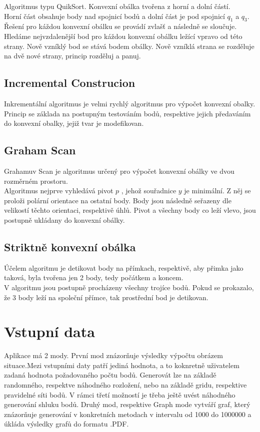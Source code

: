 \documentclass{article}
\begin{document}
Algoritmus typu QuikSort. Konvexní obálka tvořena z horní a dolní částí.\\
Horní část obsahuje body nad spojnicí bodů a dolní část je pod spojnicí $q_1$ a $q_3$.\\
Řešení pro káždou konvexní obálku se provádí zvlašť a následně se sloučuje. Hledáme nejvzdalenější bod pro káždou konvexní obálku ležící vpravo od této strany. Nově vzníklý bod se stává bodem obálky. Nově vzníklá strana se rozděluje na dvě nové strany, princip rozděluj a panuj.\\
\bigskip
\subsection{Incremental Construcion}

Inkrementální algoritmus je velmi rychlý algoritmus pro výpočet konvexní obalky. Princip se základa na postupným testováním bodů, respektive jejich předaváním do konvexní obalky, jejiž tvar je modefikovan.\\
\bigskip

\subsection{Graham Scan} 
Grahamuv Scan je algoritmus určený pro výpočet konvexní obálky ve dvou rozměrném prostoru. \\
Algoritmus nejprve vyhledává pivot $p$ , jehož souřadnice  $y$ je minimální. Z něj se proloži polární orientace na ostatní body. Body jsou následně seřazeny dle velikostí těchto orientaci, respektivě úhlů. Pivot a všechny body co leží vlevo, jsou postupně ukládany do konvexní obálky.  
\bigskip
\subsection{Striktně konvexní obálka }
Účelem algoritmu je detikovat body na přímkach, respektivě, aby přimka jako taková, byla tvořena jen 2 body, tedy počátkem a koncem. \\
V algoritmu jsou postupně procházeny všechny trojíce bodů. Pokud se prokazalo, že 3 body leží na společní přímce, tak prostřední bod je detikovan.
\bigskip
\clearpage
\newpage
\section{Vstupní data}
Aplikace má 2 mody.  První mod znázorňuje výsledky výpočtu obrázem situace.Mezi vstupními daty patří jediná hodnota, a to koknretně uživatelem zadaná hodnota požadovaného počtu bodů. Generovát lze na základě randomného, respektve náhodného rozložení, nebo na základě gridu, respektive pravidelné síti bodů. V rámci třetí možností je třeba ještě uvést náhodného generování shluku bodů.
\bigskip
Druhý mod, respektive Graph mode vytváří graf, který znázorňuje generování v konkretních metodach v intervalu od 1000 do 1000000 a úkláda výsledky grafů do formatu .PDF.
\bigskip
\clearpage
\newpage
\end{document}
